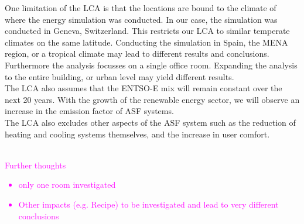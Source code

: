 One limitation of the LCA is that the locations are bound to the climate of where the energy simulation was conducted. In our case, the simulation was conducted in Geneva, Switzerland. This restricts our LCA to similar temperate climates on the same latitude. Conducting the simulation in Spain, the MENA region, or a tropical climate may lead to different results and conclusions. Furthermore the analysis focusses on a single office room. Expanding the analysis to the entire building, or urban level may yield different results.\\
The LCA also assumes that the ENTSO-E mix will remain constant over the next 20 years. With the growth of the renewable energy sector, we will observe an increase in the emission factor of ASF systems. \\
The LCA also excludes other aspects of the ASF system such as the reduction of heating and cooling systems themselves, and the increase in user comfort. 

\textcolor{magenta}{
\\Further thoughts
\begin{itemize}
\item only one room investigated
\item Other impacts (e.g. Recipe) to be investigated and lead to very different conclusions
\end{itemize}
}







